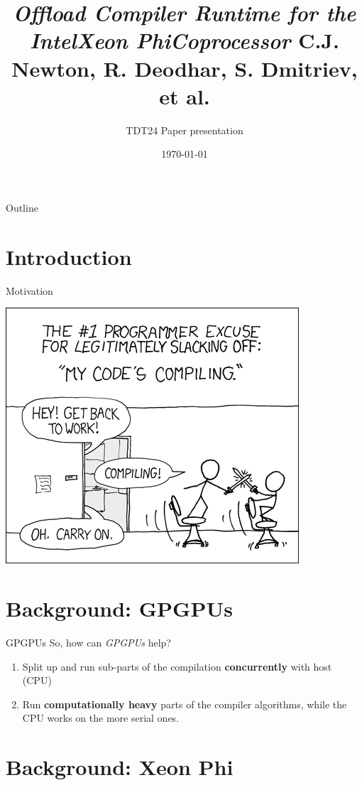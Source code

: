 \documentclass[screen]{beamer}
\title[Compiler Offloading]{\textit{Offload Compiler Runtime for the
Intel\circledR  Xeon Phi\texttrademark  Coprocessor} \newline C.J. Newton, R.
Deodhar, S. Dmitriev, et al.}
\subtitle{TDT24 Paper presentation}
\institute[IDI - NTNU]{Institutt for Datateknikk og Informasjonsvitenskap}
\date[November 2014]{\today} %
\begin{document}
\ntnutitlepage

\begin{frame}{Outline}
    \tableofcontents
\end{frame}

\section{Introduction}

\begin{frame}{Motivation}
    \pause
    \begin{center}
        \includegraphics[width=0.5\linewidth]{compiling.png}
    \end{center}
\end{frame}

\section{Background: GPGPUs}

\begin{frame}{GPGPUs}
    So, how can \textit{GPGPUs} help?
    \begin{enumerate}[<+-| alert@+>]
        \item Split up and run sub-parts of the compilation \textbf{concurrently} with host (CPU)
        \item Run \textbf{computationally heavy} parts of the compiler algorithms, while the CPU works on the more serial ones.
    \end{enumerate}
\end{frame}

\section{Background: Xeon Phi}
\end{document}
